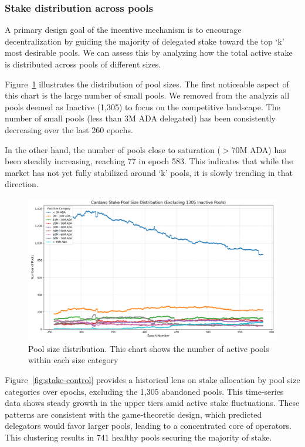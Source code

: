 \documentclass[11pt, letterpaper]{article}
\begin{document}
\subsubsection{Stake distribution across pools}

A primary design goal of the incentive mechanism is to encourage
decentralization by guiding the majority of delegated stake toward the top `k'
most desirable pools. We can assess this by analyzing how the total active
stake is distributed across pools of different sizes.

Figure~\ref{fig:pool-dist} illustrates the distribution of pool sizes. The
first noticeable aspect of this chart is the large number of small pools. We
removed from the analyzis all pools deemed as Inactive (1,305) to focus on the
competitive landscape. The number of small pools (less than 3M ADA delegated)
has been consistently decreasing over the last 260 epochs.

In the other hand, the number of pools close to saturation ($>$70M ADA) has
been steadily increasing, reaching 77 in epoch 583. This indicates that while
the market has not yet fully stabilized around `k' pools, it is slowly trending
in that direction.

\begin{figure}[H]
	\centering
	\includegraphics[width=\textwidth]{img/pool_size_distribution.png}
	\caption{Pool size distribution. This chart shows the
		number of active pools within each size category}\label{fig:pool-dist}
\end{figure}

Figure~\ref{fig:stake-control} provides a historical lens on stake allocation
by pool size categories over epochs, excluding the 1,305 abandoned pools. This time-series
data shows steady growth in the upper tiers amid active stake fluctuations. These patterns
are consistent with the game-theoretic design, which predicted delegators would favor larger
pools, leading to a concentrated core of operators. This clustering results in 741 healthy
pools securing the majority of stake.
\end{document}
